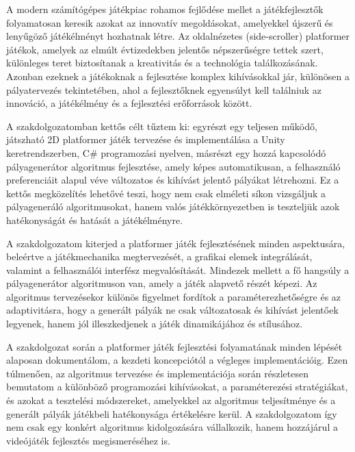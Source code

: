 
A modern számítógépes játékpiac rohamos fejlődése mellet a játékfejlesztők folyamatosan keresik azokat az innovatív megoldásokat, amelyekkel újszerű és lenyűgöző játékélményt hozhatnak létre. Az oldalnézetes (side-scroller) platformer játékok, amelyek az elmúlt évtizedekben jelentős népszerűségre tettek szert, különleges teret biztosítanak a kreativitás és a technológia találkozásának. Azonban ezeknek a játékoknak a fejlesztése komplex kihívásokkal jár, különösen a pályatervezés tekintetében, ahol a fejlesztőknek egyensúlyt kell találniuk az innováció, a játékélmény és a fejlesztési erőforrások között.

A szakdolgozatomban kettős célt tűztem ki: egyrészt egy teljesen működő, játszható 2D platformer játék tervezése és implementálása a Unity keretrendszerben, C\# programozási nyelven, másrészt egy hozzá kapcsolódó pályagenerátor algoritmus fejlesztése, amely képes automatikusan, a felhasználó preferenciáit alapul véve változatos és kihívást jelentő pályákat létrehozni. Ez a kettős megközelítés lehetővé teszi, hogy nem csak elméleti síkon vizsgáljuk a pályageneráló algoritmusokat, hanem valós játékkörnyezetben is teszteljük azok hatékonyságát és hatását a játékélményre.

A szakdolgozatom kiterjed a platformer játék fejlesztésének minden aspektusára, beleértve a játékmechanika megtervezését, a grafikai elemek integrálását, valamint a felhasználói interfész megvalósítását. Mindezek mellett a fő hangsúly a pályagenerátor algoritmuson van, amely a játék alapvető részét képezi. Az algoritmus tervezésekor különös figyelmet fordítok a paraméterezhetőségre és az adaptivitásra, hogy a generált pályák ne csak változatosak és kihívást jelentőek legyenek, hanem jól illeszkedjenek a játék dinamikájához és stílusához.

A szakdolgozat során a platformer játék fejlesztési folyamatának minden lépését alaposan dokumentálom, a kezdeti koncepciótól a végleges implementációig. Ezen túlmenően, az algoritmus tervezése és implementációja során részletesen bemutatom a különböző programozási kihívásokat, a paraméterezési stratégiákat, és azokat a tesztelési módszereket, amelyekkel az algoritmus teljesítménye és a generált pályák játékbeli hatékonysága értékelésre kerül.
A szakdolgozatom így nem csak egy konkért algoritmus kidolgozására vállalkozik, hanem hozzájárul a videójáték fejlesztés megismeréséhez is.

